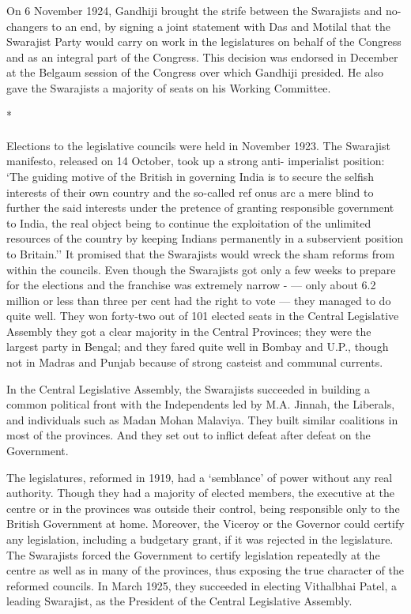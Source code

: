 On 6 November 1924, Gandhiji brought the strife between the Swarajists and no-changers to an end, by signing a joint statement with Das and Motilal that the Swarajist Party would carry on work in the legislatures on behalf of the Congress and as an integral part of the Congress. This decision was endorsed in December at the Belgaum session of the Congress over which Gandhiji presided. He also gave the Swarajists a majority of seats on his Working Committee.

\begin{center}*\end{center}

\paragraph*{}


Elections to the legislative councils were held in November 1923. The Swarajist manifesto, released on 14 October, took up a strong anti- imperialist position: `The guiding motive of the British in governing India is to secure the selfish interests of their own country and the so-called ref onus arc a mere blind to further the said interests under the pretence of granting responsible government to India, the real object being to continue the exploitation of the unlimited resources of the country by keeping Indians permanently in a subservient position to Britain.'' It promised that the Swarajists would wreck the sham reforms from within the councils. Even though the Swarajists got only a few weeks to prepare for the elections and the franchise was extremely narrow - --- only about 6.2 million or less than three per cent had the right to vote --- they managed to do quite well. They won forty-two out of 101 elected seats in the Central Legislative Assembly they got a clear majority in the Central Provinces; they were the largest party in Bengal; and they fared quite well in Bombay and U.P., though not in Madras and Punjab because of strong casteist and communal currents.

In the Central Legislative Assembly, the Swarajists succeeded in building a common political front with the Independents led by M.A. Jinnah, the Liberals, and individuals such as Madan Mohan Malaviya. They built similar coalitions in most of the provinces. And they set out to inflict defeat after defeat on the Government.

The legislatures, reformed in 1919, had a `semblance' of power without any real authority. Though they had a majority of elected members, the executive at the centre or in the provinces was outside their control, being responsible only to the British Government at home. Moreover, the Viceroy or the Governor could certify any legislation, including a budgetary grant, if it was rejected in the legislature. The Swarajists forced the Government to certify legislation repeatedly at the centre as well as in many of the provinces, thus exposing the true character of the reformed councils. In March 1925, they succeeded in electing Vithalbhai Patel, a leading Swarajist, as the President of the Central Legislative Assembly.

